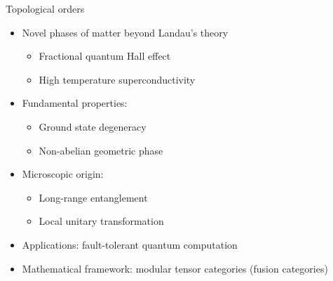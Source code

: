 \documentclass{fdubeamer}
\begin{document}
\begin{frame}{Topological orders}

\begin{itemize}
  \item Novel phases of matter beyond Landau's theory

    \begin{itemize}
      \item Fractional quantum Hall effect
      \item High temperature superconductivity
    \end{itemize}

  \item Fundamental properties:

    \begin{itemize}
      \item Ground state degeneracy
      \item Non-abelian geometric phase
    \end{itemize}

  \item Microscopic origin:

    \begin{itemize}
      \item Long-range entanglement
      \item Local unitary transformation
    \end{itemize}

  \item Applications: fault-tolerant quantum computation
  \item Mathematical framework: modular tensor categories (fusion categories)
\end{itemize}

\end{frame}
\end{document}
